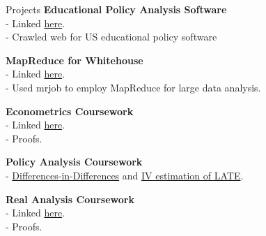 \documentclass{resume} %
\begin{document}
\begin{rSection}{Projects}
{\bf Educational Policy Analysis Software}
\\- Linked \href{https://github.com/jaked0626/EduPRJ}{here}. 
\\- Crawled web for US educational policy software 

{\bf MapReduce for Whitehouse}
\\- Linked \href{https://github.com/jaked0626/mrjob}{here}. 
\\- Used mrjob to employ MapReduce for large data analysis.

{\bf Econometrics Coursework}
\\- Linked \href{https://github.com/jaked0626/ECONOMETRICS-ECON21020}{here}. 
\\- Proofs. 

{\bf Policy Analysis Coursework}
\\- \href{https://github.com/jaked0626/soc-safety-net-empirics/blob/main/Pset3/annotated-Pset3.pdf}{Differences-in-Differences} and  \href{https://github.com/jaked0626/soc-safety-net-empirics/blob/main/Pset4/Pset4.pdf}{IV estimation of LATE}. 

{\bf Real Analysis Coursework}
\\- Linked \href{https://github.com/jaked0626/some-proofs}{here}. 
\\- Proofs. 



\end{rSection}



\end{document}

